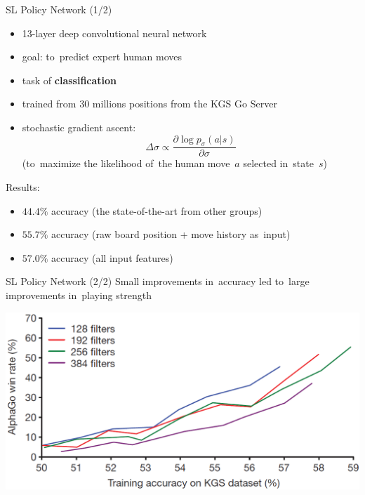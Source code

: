 \documentclass{beamer}
\begin{document}
{    \begin{frame}{SL Policy Network (1/2)}
      \begin{itemize}[<+- | alert@+>]
        \item 13-layer deep convolutional neural network
        \item goal: to~predict expert human moves
        \item task of \textbf{classification}
        \item trained from 30 millions positions from the KGS Go Server
        \item stochastic gradient ascent:
          \[
            \Delta \sigma \propto \frac{\partial \log p_\sigma (a|s)}{\partial \sigma}
          \]
          {\tiny (to~maximize the likelihood of~the human move~$a$ selected in~state~$s$)}
      \end{itemize}
      \pause

      Results:
      \pause
      \begin{itemize}[<+- | alert@+>]
        \item $44.4\%$ accuracy (the state-of-the-art from other groups)
        \item $55.7\%$ accuracy (raw board position + move history as~input)
        \item $57.0\%$ accuracy (all input features)
      \end{itemize}
    \end{frame}

    \begin{frame}{SL Policy Network (2/2)}
      Small improvements in~accuracy led to~large improvements in~playing strength
      \begin{center}
        \includegraphics[width=\textwidth]{../img/SL_policy_accuracy_vs_win_rate.png}
      \end{center}
    \end{frame}

}
\end{document}
